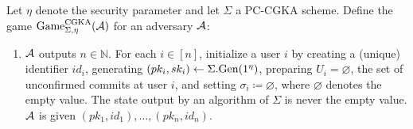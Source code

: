 \begin{definition}
	Let $\eta$ denote the security parameter and let $\Sigma$ a PC-CGKA scheme. Define the game $\mathrm{Game}_{\Sigma, \eta}^{\mathrm{CGKA}}(\mathcal{A})$ for an adversary $\mathcal{A}$:
	\begin{enumerate}[1.]
		\item \label{def:cgka-game-step-init} $\mathcal{A}$ outputs $n \in \mathbb{N}$. For each $i \in [n]$, initialize a user $i$ by creating a (unique) identifier $id_i$, generating $(pk_i, sk_i) \leftarrow \Sigma.\mathrm{Gen}(1^\eta)$, preparing $U_i = \varnothing$, the set of unconfirmed commits at user $i$, and setting $\sigma_i \coloneqq \varnothing$, where $\varnothing$ denotes the empty value. The state output by an algorithm of $\Sigma$ is never the empty value. $\mathcal{A}$ is given $(pk_1, id_1), \ldots, (pk_n, id_n)$.


\end{enumerate}
\end{definition}
